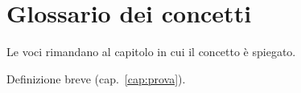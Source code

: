 \chapter{Glossario dei concetti}

Le voci rimandano al capitolo in cui il concetto è spiegato.

\begin{description}\small
\item[Concetto] Definizione breve (cap.~\ref{cap:prova}).
\end{description}
